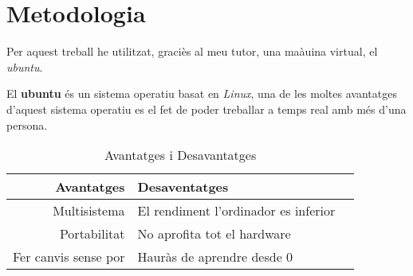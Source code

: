 \chapter{Metodologia}
Per aquest treball he utilitzat, graciès al meu tutor, una maàuina virtual, el \textit{ubuntu}.
\vspace{0.3truecm}

El \textbf{ubuntu} és un sistema operatiu basat en \textit{Linux}, una de les moltes avantatges d'aquest sistema operatiu es el fet de poder treballar a temps real amb més d'una persona.

\begin{table}[h!]
\begin{center}
\begin{tabular}{| r | l | c |}
\hline Avantatges & Desaventatges\\ \hline
\hline Multisistema & El rendiment l'ordinador es inferior \\
\hline Portabilitat & No aprofita tot el hardware \\
\hline Fer canvis sense por & Hauràs de aprendre desde 0 \\ \hline
\end{tabular}
\caption{Avantatges i Desavantatges}
\label{tab:prosicontra}
\end{center}
\end{table}
